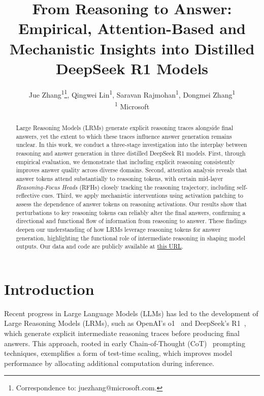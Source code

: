 \documentclass[11pt]{article}
\title{From Reasoning to Answer: Empirical, Attention-Based and Mechanistic Insights into Distilled DeepSeek R1 Models}
\author{Jue Zhang\textsuperscript{1}\thanks{Correspondence to: juezhang@microsoft.com.}, Qingwei Lin\textsuperscript{1}, Saravan Rajmohan\textsuperscript{1}, Dongmei Zhang\textsuperscript{1}\\ 
\textsuperscript{1} Microsoft}
\begin{document}
\maketitle
\begin{abstract}
Large Reasoning Models (LRMs) generate explicit reasoning traces alongside final answers, yet the extent to which these traces influence answer generation remains unclear. In this work, we conduct a three-stage investigation into the interplay between reasoning and answer generation in three distilled DeepSeek R1 models. First, through empirical evaluation, we demonstrate that including explicit reasoning consistently improves answer quality across diverse domains. Second, attention analysis reveals that answer tokens attend substantially to reasoning tokens, with certain mid-layer \emph{Reasoning-Focus Heads} (RFHs) closely tracking the reasoning trajectory, including self-reflective cues. Third, we apply mechanistic interventions using activation patching to assess the dependence of answer tokens on reasoning activations. Our results show that perturbations to key reasoning tokens can reliably alter the final answers, confirming a directional and functional flow of information from reasoning to answer. These findings deepen our understanding of how LRMs leverage reasoning tokens for answer generation, highlighting the functional role of intermediate reasoning in shaping model outputs. Our data and code are publicly available at \href{https://aka.ms/R2A-code}{this URL}.
\end{abstract}


\section{Introduction}

Recent progress in Large Language Models (LLMs) has led to the development of Large Reasoning Models (LRMs), such as OpenAI’s o1~\cite{openai2024openaio1card} and DeepSeek’s R1~\cite{deepseekai2025deepseekr1incentivizingreasoningcapability}, which generate explicit intermediate reasoning traces before producing final answers. This approach, rooted in early Chain-of-Thought (CoT)~\cite{NEURIPS2022_9d560961} prompting techniques, exemplifies a form of test-time scaling, which improves model performance by allocating additional computation during inference.
\end{document}
